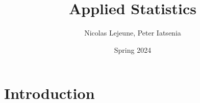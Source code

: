 \documentclass{article}
\title{Applied Statistics}
\author{Nicolas Lejeune, Peter Iatsenia}
\date{Spring 2024}
\begin{document}
\maketitle

\section{Introduction}
\end{document}
